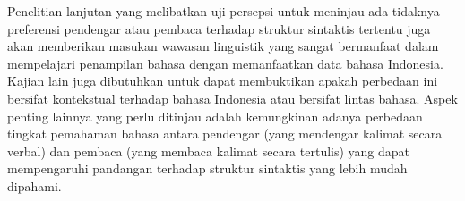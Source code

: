 Penelitian lanjutan yang melibatkan uji persepsi untuk meninjau ada tidaknya preferensi pendengar atau pembaca terhadap struktur sintaktis tertentu juga akan memberikan masukan wawasan linguistik yang sangat bermanfaat dalam mempelajari penampilan bahasa dengan memanfaatkan data bahasa Indonesia. Kajian lain juga dibutuhkan untuk dapat membuktikan apakah perbedaan ini bersifat kontekstual terhadap bahasa Indonesia atau bersifat lintas bahasa. Aspek penting lainnya yang perlu ditinjau adalah kemungkinan adanya perbedaan tingkat pemahaman bahasa antara pendengar (yang mendengar kalimat secara verbal) dan pembaca (yang membaca kalimat secara tertulis) yang dapat mempengaruhi pandangan terhadap struktur sintaktis yang lebih mudah dipahami. 